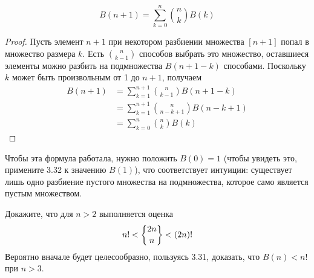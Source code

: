 \begin{thm}
$$B(n+1) = \sum_{k=0}^n{n \choose k} B(k)$$
\end{thm}
\begin{proof}
Пусть элемент $n+1$ при некотором разбиении множества $[n+1]$ попал в множество размера $k$. Есть $n\choose k - 1$ способов выбрать это множество, оставшиеся элементы можно разбить на подмножества $B(n+1-k)$ способами. Поскольку $k$ может быть произвольным от 1 до $n+1$, получаем
\begin{align*}
B(n+1) & = \sum_{k=1}^{n+1}{n\choose k-1}B(n+1-k)\\
& = \sum_{k=1}^{n+1}{n\choose n-k+1}B(n-k+1) \\
& = \sum_{k=0}^{n}{n\choose k}B(k)
\end{align*}
\end{proof}

Чтобы эта формула работала, нужно положить $B(0) = 1$ (чтобы увидеть это, примените 3.32 к значению $B(1)$), что соответствует интуиции: существует лишь одно разбиение пустого множества на подмножества, которое само является пустым множеством.

\begin{exercise}
Докажите, что для $n>2$ выполняется оценка
$$n! < \sstirling{2n}{n} < (2n)!$$
Вероятно вначале будет целесообразно, пользуясь 3.31, доказать, что $B(n) < n!$ при $n>3$.
\end{exercise}